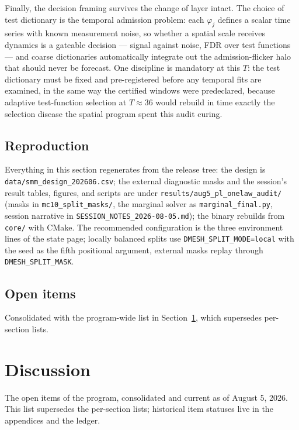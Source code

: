 \documentclass[11pt]{article}
\begin{document}
Finally, the decision framing survives the change of layer intact. The
choice of test dictionary is the temporal admission problem: each
$\varphi_j$ defines a scalar time series with known measurement noise, so
whether a spatial scale receives dynamics is a gateable decision ---
signal against noise, FDR over test functions --- and coarse dictionaries
automatically integrate out the admission-flicker halo that should never
be forecast. One discipline is mandatory at this $T$: the test dictionary
must be fixed and pre-registered before any temporal fits are examined,
in the same way the certified windows were predeclared, because adaptive
test-function selection at $T \approx 36$ would rebuild in time exactly
the selection disease the spatial program spent this audit curing.

\subsection{Reproduction}
Everything in this section regenerates from the release tree: the design is
\texttt{data/smm\_design\_202606.csv}; the external diagnostic masks and the session's
result tables, figures, and scripts are under
\texttt{results/aug5\_pl\_onelaw\_audit/} (masks in \texttt{mc10\_split\_masks/},
the marginal solver as \texttt{marginal\_final.py}, session narrative in
\texttt{SESSION\_NOTES\_2026-08-05.md}); the binary rebuilds from \texttt{core/} with
CMake. The recommended configuration is the three environment lines of the state page;
locally balanced splits use \texttt{DMESH\_SPLIT\_MODE=local} with the seed as the fifth
positional argument, external masks replay through \texttt{DMESH\_SPLIT\_MASK}.

\subsection{Open items}
Consolidated with the program-wide list in Section~\ref{sec:discussion}, which
supersedes per-section lists.





\section{Discussion}\label{sec:discussion}

The open items of the program, consolidated and current as of August 5, 2026.
This list supersedes the per-section lists; historical item statuses live in the
appendices and the ledger.
\end{document}

